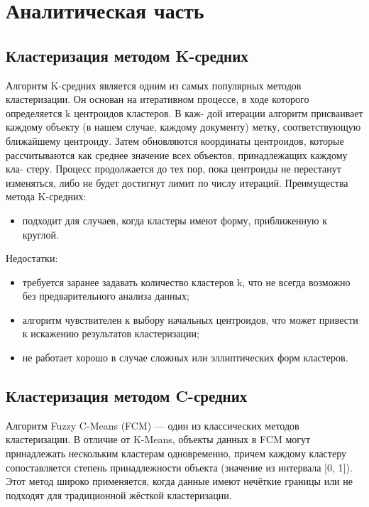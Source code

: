 \chapter{Аналитическая часть}



\section{Кластеризация методом K-средних}

Алгоритм K-средних является одним из самых популярных методов кластеризации. Он основан на итеративном процессе, в ходе которого определяется k центроидов кластеров. В каж- дой итерации алгоритм присваивает каждому объекту (в нашем случае, каждому документу) метку, соответствующую ближайшему центроиду. Затем обновляются координаты центроидов, которые рассчитываются как среднее значение всех объектов, принадлежащих каждому кла- стеру. Процесс продолжается до тех пор, пока центроиды не перестанут изменяться, либо не будет достигнут лимит по числу итераций.
Преимущества метода K-средних:
\begin{itemize}[label*=---]
	\item подходит для случаев, когда кластеры имеют форму, приближенную к круглой.
\end{itemize}
Недостатки:
\begin{itemize}[label*=---]
	\item требуется заранее задавать количество кластеров k, что не всегда возможно без предварительного анализа данных;
	\item алгоритм чувствителен к выбору начальных центроидов, что может привести к искажению результатов кластеризации;
	\item не работает хорошо в случае сложных или эллиптических форм кластеров.
\end{itemize}



\section{Кластеризация методом C-средних}

Алгоритм Fuzzy C-Means (FCM) --- один из классических методов кластеризации. В отличие от K-Means, объекты данных в FCM могут принадлежать нескольким кластерам одновременно, причем каждому кластеру сопоставляется степень принадлежности объекта (значение из интервала [0, 1]). Этот метод широко применяется, когда данные имеют нечёткие границы или не подходят для традиционной жёсткой кластеризации.

